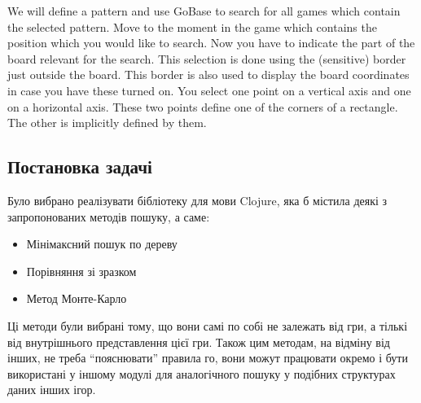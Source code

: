 We will define a pattern and use GoBase to search for all games which contain the selected pattern. Move to the moment in the game which contains the position which you would like to search. Now you have to indicate the part of the board relevant for the search. This selection is done using the (sensitive) border just outside the board. This border is also used to display the board coordinates in case you have these turned on. You select one point on a vertical axis and one on a horizontal axis. These two points define one of the corners of a rectangle. The other is implicitly defined by them.
\subsection{Постановка задачі}
Було вибрано реалізувати бібліотеку для мови Clojure, яка б містила деякі з запропонованих методів пошуку, а саме:
\begin{itemize}
	\item Мінімаксний пошук по дереву
	\item Порівняння зі зразком
	\item Метод Монте-Карло
\end{itemize}
Ці методи були вибрані тому, що вони самі по собі не залежать від гри, а тількі від внутрішнього представлення цієї гри.  Також цим методам, на відміну від інших, не треба ``пояснювати'' правила го, вони можут працювати окремо і бути використані у іншому модулі для аналогічного пошуку у подібних структурах даних інших ігор.